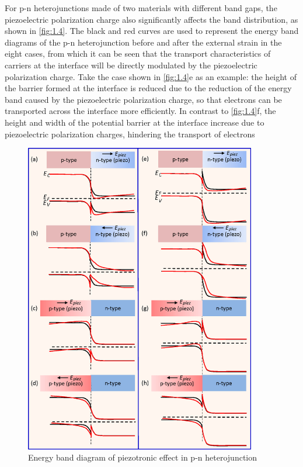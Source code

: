 For p-n heterojunctions made of two materials with different band gaps, the piezoelectric polarization charge  also significantly affects the band distribution, as shown in \autoref{fig:1.4}. The black and red curves are used to represent the energy band  diagrams of the p-n heterojunction before and after the external strain  in the eight cases, from which it can be seen that the transport characteristics of carriers at the interface  will be directly modulated  by the  piezoelectric polarization charge. Take the case shown in \autoref{fig:1.4}e as an example: the height of the barrier formed at the interface  is reduced due to the reduction of the energy band  caused by the  piezoelectric polarization charge, so that electrons can be transported across the interface  more efficiently. In contrast to \autoref{fig:1.4}f, the height and width of the potential barrier at the interface increase due to  piezoelectric polarization charges, hindering the transport of electrons

\begin{figure}[H] 
\centering    
\includegraphics[width=0.9\textwidth]{ch1_4}
\caption[Energy band diagram of piezotronic effect in p-n heterojunction]{Energy band diagram of piezotronic  effect in p-n heterojunction \protect\cite{wang2012piezotronics}}
\label{fig:1.4}
\end{figure}

